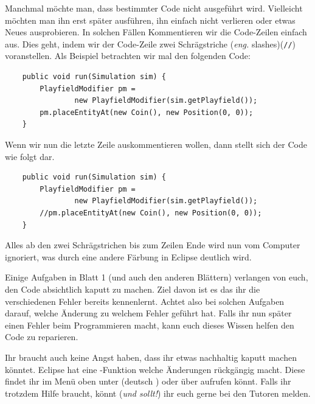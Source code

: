 \begin{Infobox}
    Manchmal möchte man, dass bestimmter Code nicht ausgeführt wird. Vielleicht möchten man ihn erst später ausführen, ihn einfach nicht verlieren oder etwas Neues ausprobieren.
    In solchen Fällen Kommentieren wir die Code-Zeilen einfach aus.
    Dies geht, indem wir der Code-Zeile zwei Schrägstriche (\emph{eng.} slashes)(\lstinline{//}) voranstellen.
    Als Beispiel betrachten wir mal den folgenden Code:\\

    \hfill
    \begin{minipage}{.96\textwidth}
        \begin{lstlisting}
    public void run(Simulation sim) {
        PlayfieldModifier pm =
                new PlayfieldModifier(sim.getPlayfield());
        pm.placeEntityAt(new Coin(), new Position(0, 0));
    }
        \end{lstlisting}
    \end{minipage}

    Wenn wir nun die letzte Zeile auskommentieren wollen, dann stellt sich der Code wie folgt dar.\\

    \hfill
    \begin{minipage}{.96\textwidth}
        \begin{lstlisting}
    public void run(Simulation sim) {
        PlayfieldModifier pm =
                new PlayfieldModifier(sim.getPlayfield());
        //pm.placeEntityAt(new Coin(), new Position(0, 0));
    }
        \end{lstlisting}
    \end{minipage}

    Alles ab den zwei Schrägstrichen bis zum Zeilen Ende wird nun vom Computer ignoriert, was durch eine andere Färbung in Eclipse deutlich wird.
\end{Infobox}


\begin{Infobox}[Fehler]
    Einige Aufgaben in Blatt 1 (und auch den anderen Blättern) verlangen von euch, den Code absichtlich kaputt zu machen.
    Ziel davon ist es das ihr die verschiedenen Fehler bereits kennenlernt.
    Achtet also bei solchen Aufgaben darauf, welche Änderung zu welchem Fehler geführt hat.
    Falls ihr nun später einen Fehler beim Programmieren macht, kann euch dieses Wissen helfen den Code zu reparieren.

    Ihr braucht auch keine Angst haben, dass ihr etwas nachhaltig kaputt machen könntet.
    Eclipse hat eine -Funktion welche Änderungen rückgängig macht. Diese findet ihr im Menü oben unter  (deutsch ) oder über  aufrufen könnt.
    Falls ihr trotzdem Hilfe braucht, könnt (\emph{und sollt!}) ihr euch gerne bei den Tutoren melden.
\end{Infobox}


